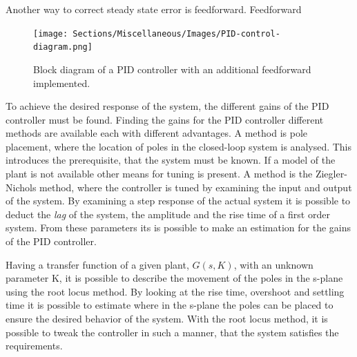 \documentclass[../../main.tex]{subfiles}
\begin{document}
Another way to correct steady state error is feedforward. Feedforward
\begin{figure}[]
    \centering
    \texttt{[image: Sections/Miscellaneous/Images/PID-control-diagram.png]}
    \caption{Block diagram of a PID controller with an additional feedforward implemented.}
    \label{fig:PID_controller}
\end{figure}


To achieve the desired response of the system, the different gains of the PID controller must be found. Finding the gains for the PID controller different methods are available each with different advantages. A method is pole placement, where the location of poles in the closed-loop system is analysed. This introduces the prerequisite, that the system must be known. If a model of the plant is not available other means for tuning is present. A method is the Ziegler-Nichols method, where the controller is tuned by examining the input and output of the system. By examining a step response of the actual system it is possible to deduct the \textit{lag} of the system, the amplitude and the rise time of a first order system. From these parameters its is possible to make an estimation for the gains of the PID controller.

Having a transfer function of a given plant, $G(s,K)$, with an unknown parameter K, it is possible to describe the movement of the poles in the s-plane using the root locus method. By looking at the rise time, overshoot and settling time it is possible to estimate where in the s-plane the poles can be placed to ensure the desired behavior of the system. %
With the root locus method, it is possible to tweak the controller in such a manner, that the system satisfies the requirements.
\end{document}
